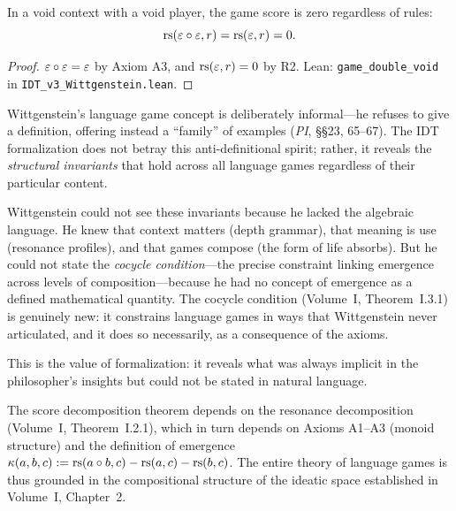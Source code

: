 \begin{theorem}
\label{thm:double-void}
In a void context with a void player, the game score is zero regardless
of rules:
\[
\mathrm{rs}(\varepsilon \circ \varepsilon, r) = \mathrm{rs}(\varepsilon, r) = 0.
\]
\end{theorem}

\begin{proof}
$\varepsilon \circ \varepsilon = \varepsilon$ by Axiom A3, and $\mathrm{rs}(\varepsilon, r) = 0$ by R2.
Lean: \texttt{game\_double\_void} in \texttt{IDT\_v3\_Wittgenstein.lean}.
\end{proof}

\begin{interpretation}
\label{interp:extends-wittgenstein}
Wittgenstein's language game concept is deliberately informal---he refuses to
give a definition, offering instead a ``family'' of examples (\textit{PI},
\S\S23, 65--67). The IDT formalization does not betray this anti-definitional
spirit; rather, it reveals the \emph{structural invariants} that hold across
all language games regardless of their particular content.

Wittgenstein could not see these invariants because he lacked the algebraic
language. He knew that context matters (depth grammar), that meaning is use
(resonance profiles), and that games compose (the form of life absorbs).
But he could not state the \emph{cocycle condition}---the precise constraint
linking emergence across levels of composition---because he had no concept
of emergence as a defined mathematical quantity. The cocycle condition
(Volume~I, Theorem~I.3.1) is genuinely new: it constrains language games in
ways that Wittgenstein never articulated, and it does so necessarily, as a
consequence of the axioms.

This is the value of formalization: it reveals what was always implicit in
the philosopher's insights but could not be stated in natural language.
\end{interpretation}

\begin{remark}
The score decomposition theorem depends on the resonance decomposition
(Volume~I, Theorem~I.2.1), which in turn depends on Axioms A1--A3
(monoid structure) and the definition of emergence $\kappa(a,b,c) :=
\mathrm{rs}(a \circ b, c) - \mathrm{rs}(a,c) - \mathrm{rs}(b,c)$. The entire theory of language
games is thus grounded in the compositional structure of the ideatic space
established in Volume~I, Chapter~2.
\end{remark}

